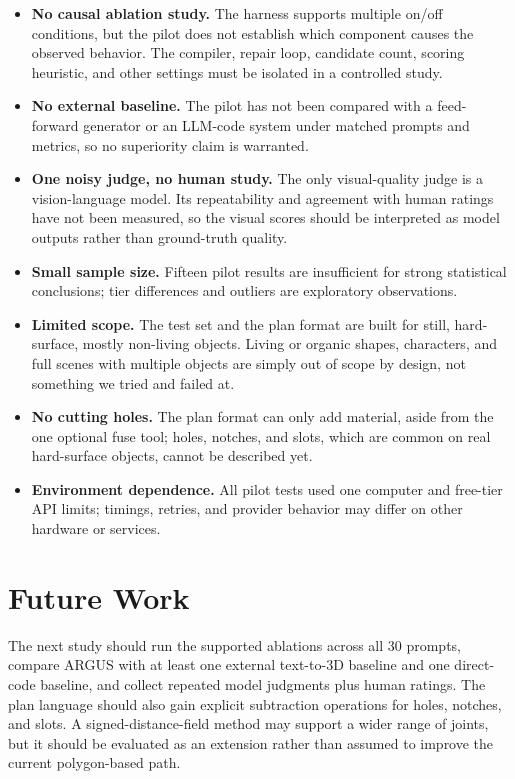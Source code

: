 \documentclass[conference]{IEEEtran}
\begin{document}
\begin{itemize}
\item \textbf{No causal ablation study.} The harness supports multiple on/off conditions, but the pilot does not establish which component causes the observed behavior. The compiler, repair loop, candidate count, scoring heuristic, and other settings must be isolated in a controlled study.
\item \textbf{No external baseline.} The pilot has not been compared with a feed-forward generator or an LLM-code system under matched prompts and metrics, so no superiority claim is warranted.
\item \textbf{One noisy judge, no human study.} The only visual-quality judge is a vision-language model. Its repeatability and agreement with human ratings have not been measured, so the visual scores should be interpreted as model outputs rather than ground-truth quality.
\item \textbf{Small sample size.} Fifteen pilot results are insufficient for strong statistical conclusions; tier differences and outliers are exploratory observations.
\item \textbf{Limited scope.} The test set and the plan format are built for still, hard-surface, mostly non-living objects. Living or organic shapes, characters, and full scenes with multiple objects are simply out of scope by design, not something we tried and failed at.
\item \textbf{No cutting holes.} The plan format can only add material, aside from the one optional fuse tool; holes, notches, and slots, which are common on real hard-surface objects, cannot be described yet.
\item \textbf{Environment dependence.} All pilot tests used one computer and free-tier API limits; timings, retries, and provider behavior may differ on other hardware or services.
\end{itemize}

\section{Future Work}
The next study should run the supported ablations across all 30 prompts, compare ARGUS with at least one external text-to-3D baseline and one direct-code baseline, and collect repeated model judgments plus human ratings. The plan language should also gain explicit subtraction operations for holes, notches, and slots. A signed-distance-field method may support a wider range of joints, but it should be evaluated as an extension rather than assumed to improve the current polygon-based path.
\end{document}
